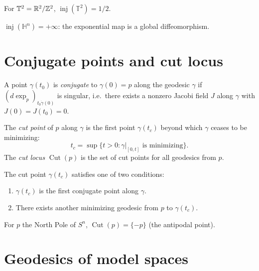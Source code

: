 \begin{example}
For $\mathbb{T}^2 = \mathbb{R}^2/\mathbb{Z}^2$, $\operatorname{inj}(\mathbb{T}^2) = 1/2$.
\end{example}

\begin{example}
$\operatorname{inj}(\mathbb{H}^n) = +\infty$: the exponential map is a global
diffeomorphism.
\end{example}

\section{Conjugate points and cut locus}

\begin{definition}
A point $\gamma(t_0)$ is \emph{conjugate} to $\gamma(0) = p$ along the geodesic
$\gamma$ if $(d\exp_p)_{t_0 \dot\gamma(0)}$ is singular, i.e.\ there exists a
nonzero Jacobi field $J$ along $\gamma$ with $J(0) = J(t_0) = 0$.
\end{definition}

\begin{definition}
The \emph{cut point} of $p$ along $\gamma$ is the first point $\gamma(t_c)$
beyond which $\gamma$ ceases to be minimizing:
\[
    t_c = \sup\{t > 0 : \gamma|_{[0,t]} \text{ is minimizing}\}.
\]
The \emph{cut locus} $\operatorname{Cut}(p)$ is the set of cut points for all
geodesics from $p$.
\end{definition}

\begin{theorem}
The cut point $\gamma(t_c)$ satisfies one of two conditions:
\begin{enumerate}
    \item $\gamma(t_c)$ is the first conjugate point along $\gamma$.
    \item There exists another minimizing geodesic from $p$ to $\gamma(t_c)$.
\end{enumerate}
\end{theorem}

\begin{example}
For $p$ the North Pole of $S^n$, $\operatorname{Cut}(p) = \{-p\}$ (the antipodal point).
\end{example}

\section{Geodesics of model spaces}

